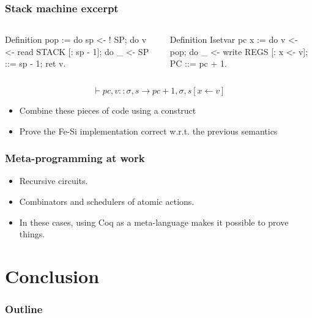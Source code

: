 \documentclass[9pt]{beamer}
\begin{document}
\begin{frame}[fragile]
  \frametitle{Stack machine excerpt}
  \begin{columns}
\begin{coq}
Definition pop :=
do sp <- ! SP;       
do v <- read STACK [: sp - 1];
do _ <- SP ::= sp - 1;
ret v.    
\end{coq}
\begin{coq}
Definition Isetvar pc x := 
do v <- pop; 
do _ <- write REGS [: x <- v];
PC ::= pc + 1.
$ $
\end{coq}
  \end{columns}
  \begin{displaymath}
\vdash pc,v::\sigma,s \to pc+1, \sigma,s[x \leftarrow v]
  \end{displaymath}
  \begin{itemize}
  \item Combine these pieces of code using a  construct
  \item Prove the Fe-Si implementation correct w.r.t. the previous semantics
  \end{itemize}
\end{frame}
\begin{frame}[fragile]
  \frametitle{Meta-programming at work}

  \begin{itemize}
  \item Recursive circuits. 
  \item \alert{Combinators and schedulers} of atomic actions.
  \item In these cases, using Coq as a meta-language makes it possible
    to prove things. 
  \end{itemize}
\end{frame}


\section{Conclusion}
\begin{frame}
  \frametitle{Outline}       
  \tableofcontents [currentsection] 
\end{frame}
\end{document}
